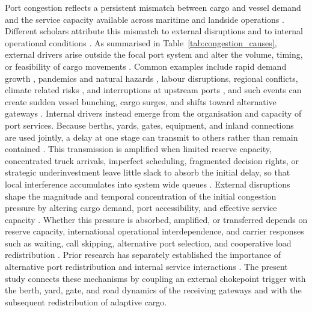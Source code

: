 \documentclass[a4paper,fleqn]{cas-sc}
\begin{document}
Port congestion reflects a persistent mismatch between cargo and vessel demand and the service capacity available across maritime and landside operations \citep{FanEtAl2012,WangEtAl2020}. Different scholars attribute this mismatch to external disruptions \citep{WangZhang2018,XiaEtAl2024} and to internal operational conditions \citep{LeachmanJula2011,LeiJia2026}. As summarised in Table~\ref{tab:congestion_causes}, external drivers arise outside the focal port system and alter the volume, timing, or feasibility of cargo movements \citep{CaoEtAl2025}. Common examples include rapid demand growth \citep{FanEtAl2012}, pandemics and natural hazards \citep{CaoEtAl2025}, labour disruptions, regional conflicts, climate related risks \citep{XiaEtAl2024}, and interruptions at upstream ports \citep{LuEtAl2024}, and such events can create sudden vessel bunching, cargo surges, and shifts toward alternative gateways \citep{XuEtAl2025,XiaEtAl2024}. Internal drivers instead emerge from the organisation and capacity of port services. Because berths, yards, gates, equipment, and inland connections are used jointly, a delay at one stage can transmit to others rather than remain contained \citep{TalleyNg2016,Zhen2016,ZhangEtAl2025}. This transmission is amplified when limited reserve capacity, concentrated truck arrivals, imperfect scheduling, fragmented decision rights, or strategic underinvestment leave little slack to absorb the initial delay, so that local interference accumulates into system wide queues \citep{PhanKim2015,PhanKim2016,ChenLiu2016,YangEtAl2025}. External disruptions shape the magnitude and temporal concentration of the initial congestion pressure by altering cargo demand, port accessibility, and effective service capacity \citep{FanEtAl2012,WangZhang2018,XiaEtAl2024,CaoEtAl2025}. Whether this pressure is absorbed, amplified, or transferred depends on reserve capacity, international operational interdependence, and carrier responses such as waiting, call skipping, alternative port selection, and cooperative load redistribution \citep{TalleyNg2016,Zhen2016,ZhangEtAl2025,XuEtAl2022,XuEtAl2025,LuEtAl2024}. Prior research has separately established the importance of alternative port redistribution and internal service interactions \citep{XuEtAl2022,XuEtAl2025,ZhangEtAl2025}. The present study connects these mechanisms by coupling an external chokepoint trigger with the berth, yard, gate, and road dynamics of the receiving gateways and with the subsequent redistribution of adaptive cargo.
\end{document}
